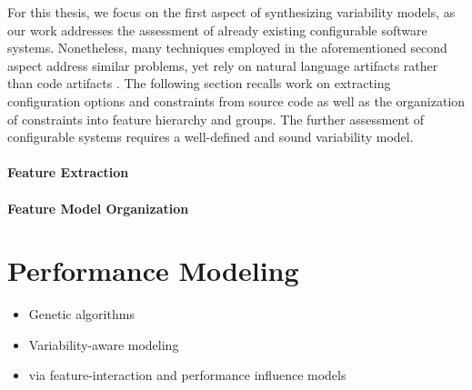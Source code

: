 For this thesis, we focus on the first aspect of synthesizing variability
models, as our work addresses the assessment of already existing configurable
software systems. Nonetheless, many techniques employed in the aforementioned
second aspect address similar problems, yet rely on natural language artifacts
rather than code artifacts \citep{alves_exploratory_2008,bakar_feature_2015}.
The following section recalls work on extracting configuration options and
constraints from source code as well as the organization of constraints into
feature hierarchy and groups. The further assessment of configurable systems
requires a well-defined and sound variability model.

\paragraph*{Feature Extraction} \cite{rabkin_static_2011,nadi_where_2015,zhou_extracting_2015}

\paragraph*{Feature Model Organization} \cite{she_reverse_2011,andersen_efficient_2012}

\section{Performance Modeling} \label{sec:2.4}
\begin{itemize}
  \item Genetic algorithms \citep{guo_genetic_2011}
  \item Variability-aware modeling \citep{guo_variability-aware_2013}
  \item via feature-interaction and performance influence models
  \citep{siegmund_predicting_2012,siegmund_performance-influence_2015}
\end{itemize}